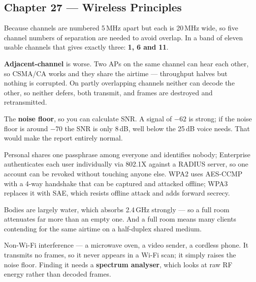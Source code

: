 \subsection*{Chapter 27 --- Wireless Principles}
\begin{tightnum}
  \item Because channels are numbered 5\,MHz apart but each is 20\,MHz wide, so
        five channel numbers of separation are needed to avoid overlap. In a band
        of eleven usable channels that gives exactly three: \textbf{1, 6 and 11}.
  \item \textbf{Adjacent-channel} is worse. Two APs on the same channel can hear
        each other, so CSMA/CA works and they share the airtime --- throughput
        halves but nothing is corrupted. On partly overlapping channels neither
        can decode the other, so neither defers, both transmit, and frames are
        destroyed and retransmitted.
  \item The \textbf{noise floor}, so you can calculate SNR. A signal of $-62$ is
        strong; if the noise floor is around $-70$ the SNR is only 8\,dB, well
        below the 25\,dB voice needs. That would make the report entirely normal.
  \item Personal shares one passphrase among everyone and identifies nobody;
        Enterprise authenticates each user individually via 802.1X against a
        RADIUS server, so one account can be revoked without touching anyone else.
        WPA2 uses AES-CCMP with a 4-way handshake that can be captured and
        attacked offline; WPA3 replaces it with SAE, which resists offline attack
        and adds forward secrecy.
  \item Bodies are largely water, which absorbs 2.4\,GHz strongly --- so a full
        room attenuates far more than an empty one. And a full room means many
        clients contending for the same airtime on a half-duplex shared medium.
  \item Non-Wi-Fi interference --- a microwave oven, a video sender, a cordless
        phone. It transmits no frames, so it never appears in a Wi-Fi scan; it
        simply raises the noise floor. Finding it needs a \textbf{spectrum
        analyser}, which looks at raw RF energy rather than decoded frames.
\end{tightnum}

